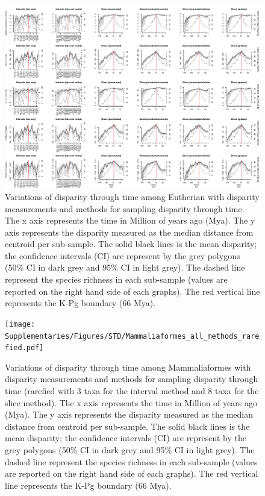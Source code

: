 \begin{landscape}
\begin{figure}[!htbp]
\centering
    \includegraphics[width=\textwidth,height=\textheight,keepaspectratio]{Supplementaries/Figures/STD/Eutheria_all_methods.pdf}
\caption[Comparison of all the disparity metrics and all the time series methods for Eutheria]{Variations of disparity through time among Eutherian with disparity measurements and methods for sampling disparity through time. The x axis represents the time in Million of years ago (Mya). The y axis represents the disparity measured as the median distance from centroid per sub-sample. The solid black lines is the mean disparity; the confidence intervals (CI) are represent by the grey polygons (50\% CI in dark grey and 95\% CI in light grey). The dashed line represent the species richness in each sub-sample (values are reported on the right hand side of each graphs). The red vertical line represents the K-Pg boundary (66 Mya).}
\end{figure}
\label{Supp_disparity_all_Eutheria}
\end{landscape}

\begin{landscape}
\begin{figure}[!htbp]
\centering
    \texttt{[image: Supplementaries/Figures/STD/Mammaliaformes\_all\_methods\_rarefied.pdf]}
\caption[Comparison of all the disparity metrics and all the time series methods for Mammaliaformes (rarefied)]{Variations of disparity through time among Mammaliaformes with disparity measurements and methods for sampling disparity through time (rarefied with 3 taxa for the interval method and 8 taxa for the slice method). The x axis represents the time in Million of years ago (Mya). The y axis represents the disparity measured as the median distance from centroid per sub-sample. The solid black lines is the mean disparity; the confidence intervals (CI) are represent by the grey polygons (50\% CI in dark grey and 95\% CI in light grey). The dashed line represent the species richness in each sub-sample (values are reported on the right hand side of each graphs). The red vertical line represents the K-Pg boundary (66 Mya).}
\end{figure}
\label{Supp_disparity_all_Mammaliaformes_rarefied}
\end{landscape}


